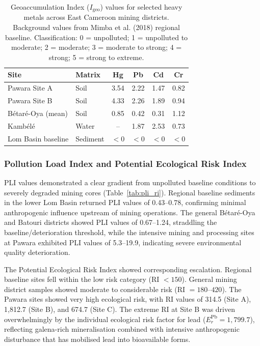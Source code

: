 \documentclass[preprint,12pt,authoryear]{elsarticle}
\begin{document}
\begin{table}[h!]
\centering
\caption{Geoaccumulation Index ($I_\text{geo}$) values for selected heavy metals across East Cameroon mining districts. Background values from Mimba et al. (2018) regional baseline. Classification: 0 = unpolluted; 1 = unpolluted to moderate; 2 = moderate; 3 = moderate to strong; 4 = strong; 5 = strong to extreme.}
\label{tab:igeo}
\small
\begin{tabular}{llcccc}
\toprule
Site & Matrix & Hg & Pb & Cd & Cr \\
\midrule
Pawara Site A & Soil & 3.54 & 2.22 & 1.47 & 0.82 \\
Pawara Site B & Soil & 4.33 & 2.26 & 1.89 & 0.94 \\
B\'{e}tar\'{e}-Oya (mean) & Soil & 0.85 & 0.42 & 0.31 & 1.12 \\
Kamb\'{e}l\'{e} & Water & -- & 1.87 & 2.53 & 0.73 \\
Lom Basin baseline & Sediment & $<$0 & $<$0 & $<$0 & $<$0 \\
\bottomrule
\end{tabular}
\end{table}

\subsubsection{Pollution Load Index and Potential Ecological Risk Index}

PLI values demonstrated a clear gradient from unpolluted baseline conditions to severely degraded mining cores (Table~\ref{tab:pli_ri}). Regional baseline sediments in the lower Lom Basin returned PLI values of 0.43--0.78, confirming minimal anthropogenic influence upstream of mining operations. The general B\'{e}tar\'{e}-Oya and Batouri districts showed PLI values of 0.67--1.24, straddling the baseline/deterioration threshold, while the intensive mining and processing sites at Pawara exhibited PLI values of 5.3--19.9, indicating severe environmental quality deterioration.

The Potential Ecological Risk Index showed corresponding escalation. Regional baseline sites fell within the low risk category (RI $< 150$). General mining district samples showed moderate to considerable risk (RI $= 180$--$420$). The Pawara sites showed very high ecological risk, with RI values of 314.5 (Site A), 1,812.7 (Site B), and 674.7 (Site C). The extreme RI at Site B was driven overwhelmingly by the individual ecological risk factor for lead ($E_r^\text{Pb} = 1{,}799.7$), reflecting galena-rich mineralisation combined with intensive anthropogenic disturbance that has mobilised lead into bioavailable forms.
\end{document}
